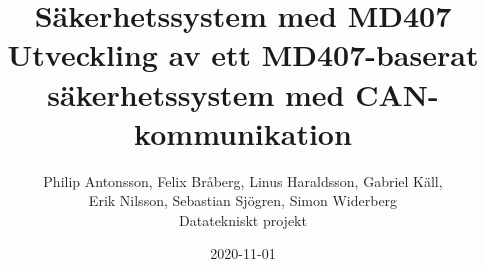 \documentclass[a4paper]{article}
\begin{document}
\title{
  Säkerhetssystem med MD407 \\
  \large Utveckling av ett MD407-baserat säkerhetssystem med CAN-kommunikation}
\date{2020-11-01}

\author{ Philip Antonsson, Felix Bråberg, Linus Haraldsson,  Gabriel Käll,\\  Erik Nilsson, Sebastian Sjögren, Simon Widerberg \\Datatekniskt projekt}

\maketitle
\thispagestyle{empty}
\newpage
\thispagestyle{empty}
\newpage




\tableofcontents
{}
\newpage

\newpage

\newpage

\newpage

\newpage

\newpage

\newpage

\newpage

 

 
\newpage

\end{document}
